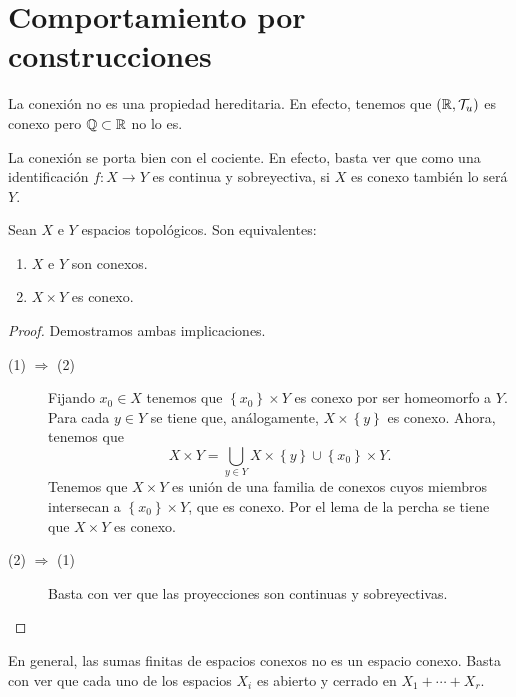 \section{Comportamiento por construcciones}
\begin{observation}[No es hereditaria]
La conexión no es una propiedad hereditaria. En efecto, tenemos que $\displaystyle \left(\mathbb{R}, \mathcal{T}_{u}\right) $ es conexo pero $\displaystyle \mathbb{Q}\subset \mathbb{R} $ no lo es.
\end{observation}
\begin{observation}
La conexión se porta bien con el cociente. En efecto, basta ver que como una identificación $\displaystyle f :X \to Y $ es continua y sobreyectiva, si $\displaystyle X $ es conexo también lo será $\displaystyle Y $.
\end{observation}
 
\begin{prop}
Sean $\displaystyle X $ e $\displaystyle Y $ espacios topológicos. Son equivalentes:
\begin{enumerate}
\item $\displaystyle X $ e $\displaystyle Y $ son conexos. 
\item $\displaystyle X \times Y $ es conexo.
\end{enumerate}
\end{prop}
\begin{proof}
Demostramos ambas implicaciones.
\begin{description}
	\item[(1) $\displaystyle \Rightarrow $ (2)] Fijando $\displaystyle x_{0}\in X $ tenemos que $\displaystyle \left\{ x_{0}\right\} \times Y $ es conexo por ser homeomorfo a $\displaystyle Y $. Para cada $\displaystyle y \in Y $ se tiene que, análogamente, $\displaystyle X \times \left\{ y\right\}  $ es conexo. Ahora, tenemos que 
		\[X \times Y = \bigcup_{y \in Y}X \times \left\{ y\right\} \cup \left\{ x_{0}\right\} \times Y .\]
	Tenemos que $\displaystyle X \times Y $ es unión de una familia de conexos cuyos miembros intersecan a $\displaystyle \left\{ x_{0}\right\} \times Y $, que es conexo. Por el lema de la percha se tiene que $\displaystyle X\times Y $ es conexo. 
\item[(2) $\displaystyle \Rightarrow $ (1)] Basta con ver que las proyecciones son continuas y sobreyectivas.
\end{description}
\end{proof}
\begin{observation}
En general, las sumas finitas de espacios conexos no es un espacio conexo. Basta con ver que cada uno de los espacios $\displaystyle X_{i} $ es abierto y cerrado en $\displaystyle X_{1} + \cdots + X_{r} $.
\end{observation}
 
